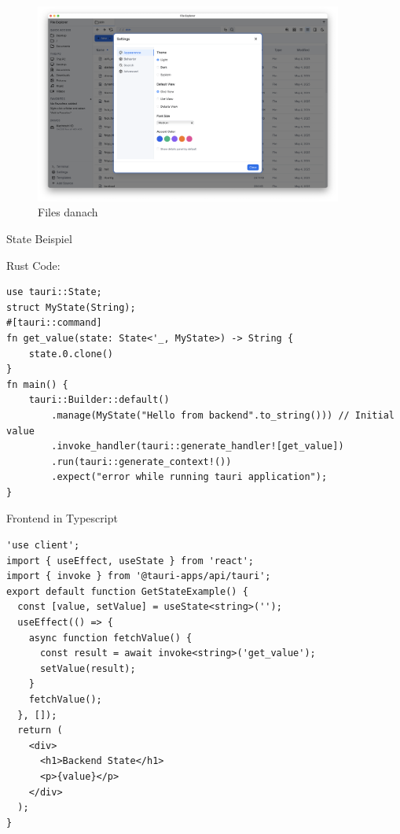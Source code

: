 \begin{figure}[H]
    \centering
    \includegraphics[width=0.9\textwidth]{before-after-images/Settings.png}
    \caption{Files danach}
\end{figure}

\newpage

\LARGE
State Beispiel
\label{subsec:state-example}
\large

Rust Code:
{\small
\begin{verbatim}
use tauri::State;
struct MyState(String);
#[tauri::command]
fn get_value(state: State<'_, MyState>) -> String {
    state.0.clone()
}
fn main() {
    tauri::Builder::default()
        .manage(MyState("Hello from backend".to_string())) // Initial value
        .invoke_handler(tauri::generate_handler![get_value])
        .run(tauri::generate_context!())
        .expect("error while running tauri application");
}
\end{verbatim}
}


Frontend in Typescript
{\small

\begin{verbatim}
'use client';
import { useEffect, useState } from 'react';
import { invoke } from '@tauri-apps/api/tauri';
export default function GetStateExample() {
  const [value, setValue] = useState<string>('');
  useEffect(() => {
    async function fetchValue() {
      const result = await invoke<string>('get_value');
      setValue(result);
    }
    fetchValue();
  }, []);
  return (
    <div>
      <h1>Backend State</h1>
      <p>{value}</p>
    </div>
  );
}
\end{verbatim}
}


